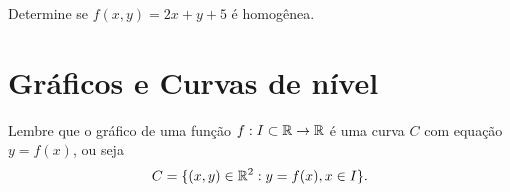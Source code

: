 \begin{exercise}
    Determine se \(f(x,y) = 2x + y + 5\) é homogênea.
\end{exercise}

\section{Gráficos e Curvas de nível}

Lembre que o gráfico de uma função \(f:I\subset\mathbb{R} \to \mathbb{R}\) é uma curva \(C\) com equação \(y = f(x)\), ou seja \[C = \{(x,y)\in\mathbb{R}^2 : y = f(x), x\in I\}.\]

